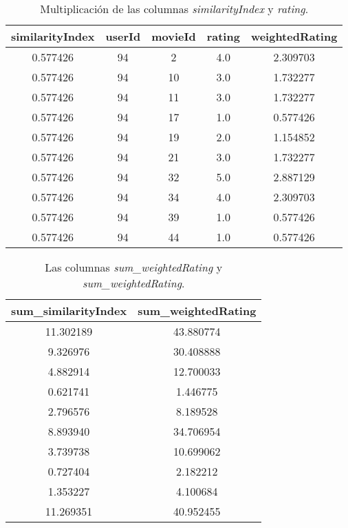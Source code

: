 \documentclass{uimppracticas}
\begin{document}
\begin{table}[H]
	\centering
	\begin{tabular}{ccccc}
		\toprule
		similarityIndex &  userId &  movieId &  rating &  weightedRating \\
		\midrule
		0.577426 &      94 &        2 &     4.0 &        2.309703 \\
		0.577426 &      94 &       10 &     3.0 &        1.732277 \\
		0.577426 &      94 &       11 &     3.0 &        1.732277 \\
		0.577426 &      94 &       17 &     1.0 &        0.577426 \\
		0.577426 &      94 &       19 &     2.0 &        1.154852 \\
		0.577426 &      94 &       21 &     3.0 &        1.732277 \\
		0.577426 &      94 &       32 &     5.0 &        2.887129 \\
		0.577426 &      94 &       34 &     4.0 &        2.309703 \\
		0.577426 &      94 &       39 &     1.0 &        0.577426 \\
		0.577426 &      94 &       44 &     1.0 &        0.577426 \\
		\bottomrule
	\end{tabular}
	\caption{Multiplicación de las columnas \textit{similarityIndex} y \textit{rating}.}
	\label{weightedRating}
\end{table}

\begin{table}[H]
	\centering
	\begin{tabular}{cc}
		\toprule
		sum\_similarityIndex &  sum\_weightedRating \\
		\midrule
		11.302189 &           43.880774 \\
		9.326976 &           30.408888 \\
		4.882914 &           12.700033 \\
		0.621741 &            1.446775 \\
		2.796576 &            8.189528 \\
		8.893940 &           34.706954 \\
		3.739738 &           10.699062 \\
		0.727404 &            2.182212 \\
		1.353227 &            4.100684 \\
		11.269351 &           40.952455 \\
		\bottomrule
	\end{tabular}
	\caption{Las columnas \textit{sum\_weightedRating} y \textit{sum\_weightedRating}.}
	\label{sums}
\end{table}
\end{document}
